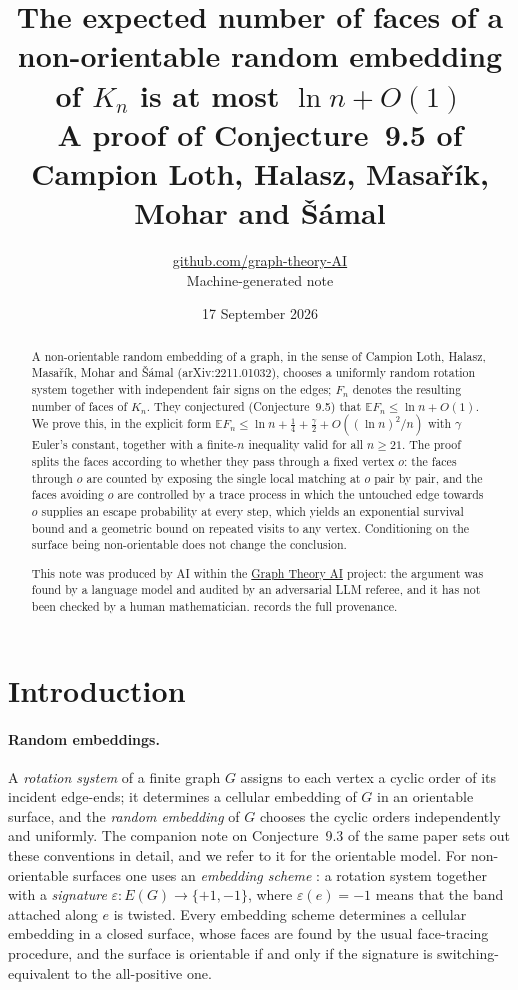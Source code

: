 \documentclass[11pt,a4paper]{article}
\title{The expected number of faces of a non-orientable random embedding of $K_n$ is at most $\ln n+O(1)$\\[4pt] \large A proof of Conjecture~9.5 of Campion Loth, Halasz, Masařík, Mohar and Šámal}
\author{\href{https://github.com/graph-theory-AI}{github.com/graph-theory-AI}\\[2pt] \normalsize Machine-generated note}
\date{17 September 2026}
\theoremstyle{plain}
\theoremstyle{definition}
\theoremstyle{remark}
\newcommand{\E}{\mathbb E}
\begin{document}
\maketitle

\begin{abstract}
A non-orientable random embedding of a graph, in the sense of Campion Loth, Halasz, Masařík, Mohar and Šámal (arXiv:2211.01032), chooses a uniformly random rotation system together with independent fair signs on the edges; $F_n$ denotes the resulting number of faces of $K_n$. They conjectured (Conjecture~9.5) that $\E F_n\le\ln n+O(1)$. We prove this, in the explicit form $\E F_n\le\ln n+\tfrac14+\tfrac\gamma2+O((\ln n)^2/n)$ with $\gamma$ Euler's constant, together with a finite-$n$ inequality valid for all $n\ge21$. The proof splits the faces according to whether they pass through a fixed vertex $o$: the faces through $o$ are counted by exposing the single local matching at $o$ pair by pair, and the faces avoiding $o$ are controlled by a trace process in which the untouched edge towards $o$ supplies an escape probability at every step, which yields an exponential survival bound and a geometric bound on repeated visits to any vertex. Conditioning on the surface being non-orientable does not change the conclusion.

\medskip\noindent\small
This note was produced by AI within the \href{https://github.com/graph-theory-AI/Graph-Theory-LLM-Proofs}{Graph Theory AI} project:
the argument was found by a language model and audited by an adversarial LLM
referee, and it has not been checked by a human mathematician.
 records the full provenance.
\end{abstract}

\section{Introduction}\label{sec:intro}

\paragraph{Random embeddings.}
A \emph{rotation system} of a finite graph $G$ assigns to each vertex a cyclic order of its incident edge-ends; it determines a cellular embedding of $G$ in an orientable surface, and the \emph{random embedding} of $G$ chooses the cyclic orders independently and uniformly. The companion note on Conjecture~9.3 of the same paper \cite{Note02} sets out these conventions in detail, and we refer to it for the orientable model. For non-orientable surfaces one uses an \emph{embedding scheme} \cite{MT01,GT87}: a rotation system together with a \emph{signature} $\varepsilon\colon E(G)\to\{+1,-1\}$, where $\varepsilon(e)=-1$ means that the band attached along $e$ is twisted. Every embedding scheme determines a cellular embedding in a closed surface, whose faces are found by the usual face-tracing procedure, and the surface is orientable if and only if the signature is switching-equivalent to the all-positive one.
\end{document}
